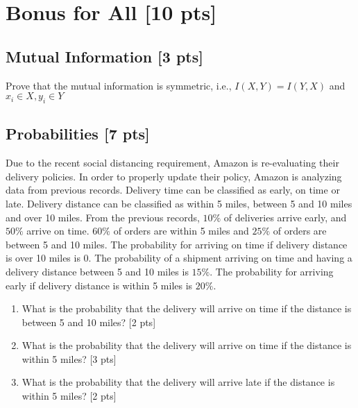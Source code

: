 \documentclass{article}
\begin{document}
\section{Bonus for All [10 pts]}
\subsection{Mutual Information [3 pts]}
Prove that the mutual information is symmetric, i.e., $I(X, Y) = I(Y, X)$ and $x_i \in X, y_i \in Y$

  
\subsection{Probabilities [7 pts]}
Due to the recent social distancing requirement, Amazon is re-evaluating their delivery policies. In order to properly update their policy, Amazon is analyzing data from previous records. Delivery time can be classified as early, on time or late. Delivery distance can be classified as within 5 miles, between 5 and 10 miles and over 10 miles. From the previous records, $10\%$ of deliveries arrive early, and $50\%$ arrive on time. $60\%$ of orders are within 5 miles and $25\%$ of orders are between 5 and 10 miles. The probability for arriving on time if delivery distance is over 10 miles is 0. The probability of a shipment arriving on time and having a delivery distance between 5 and 10 miles is $15\%$. The probability for arriving early if delivery distance is within 5 miles is $20\%$.

\begin{enumerate}[label=(\alph*)]
\item What is the probability that the delivery will arrive on time if the distance is between 5 and 10 miles? [2 pts]
\item What is the probability that the delivery will arrive on time if the distance is within 5 miles? [3 pts]
\item What is the probability that the delivery will arrive late if the distance is within 5 miles? [2 pts]
\end{enumerate}
\end{document}

